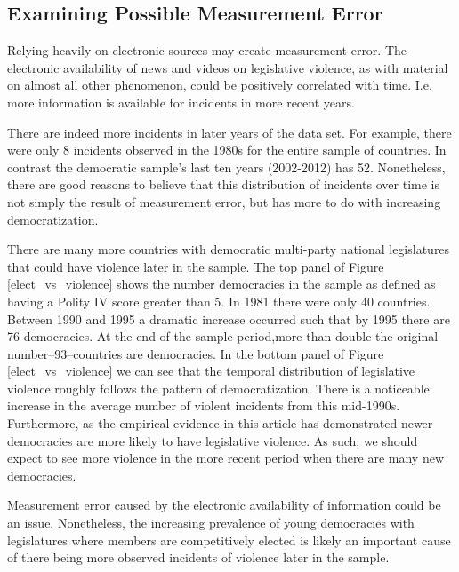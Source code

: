 \documentclass[a4paper]{article}\usepackage[]{graphicx}\usepackage[]{color}
\begin{document}
\subsection*{Examining Possible Measurement Error}

Relying heavily on electronic sources may create measurement error. The electronic availability of news and videos on legislative violence, as with material on almost all other phenomenon, could be positively correlated with time. I.e. more information is available for incidents in more recent years.

There are indeed more incidents in later years of the data set. For example, there were only 8 incidents observed in the 1980s for the entire sample of countries. In contrast the democratic sample's last ten years (2002-2012) has 52. Nonetheless, there are good reasons to believe that this distribution of incidents over time is not simply the result of measurement error, but has more to do with increasing democratization.

There are many more countries with democratic multi-party national legislatures that could have violence later in the sample. The top panel of Figure \ref{elect_vs_violence} shows the number democracies in the sample as defined as having a Polity IV score greater than 5. In 1981 there were only 40 countries. Between 1990 and 1995 a dramatic increase occurred such that by 1995 there are 76 democracies. At the end of the sample period,more than double the original number--93--countries are democracies. In the bottom panel of Figure \ref{elect_vs_violence} we can see that the temporal distribution of legislative violence roughly follows the pattern of democratization. There is a noticeable increase in the average number of violent incidents from this mid-1990s. Furthermore, as the empirical evidence in this article has demonstrated newer democracies are more likely to have legislative violence. As such, we should expect to see more violence in the more recent period when there are many new democracies.

Measurement error caused by the electronic availability of information could be an issue. Nonetheless, the increasing prevalence of young democracies with legislatures where members are competitively elected is likely an important cause of there being more observed incidents of violence later in the sample.
\end{document}
